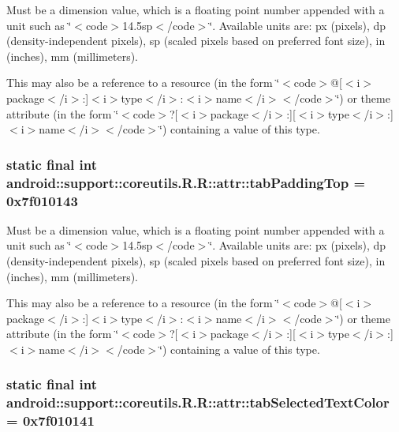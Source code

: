 Must be a dimension value, which is a floating point number appended with a unit such as \char`\"{}$<$code$>$14.5sp$<$/code$>$\char`\"{}. Available units are: px (pixels), dp (density-independent pixels), sp (scaled pixels based on preferred font size), in (inches), mm (millimeters). 

This may also be a reference to a resource (in the form \char`\"{}$<$code$>$@\mbox{[}$<$i$>$package$<$/i$>$:\mbox{]}$<$i$>$type$<$/i$>$:$<$i$>$name$<$/i$>$$<$/code$>$\char`\"{}) or theme attribute (in the form \char`\"{}$<$code$>$?\mbox{[}$<$i$>$package$<$/i$>$:\mbox{]}\mbox{[}$<$i$>$type$<$/i$>$:\mbox{]}$<$i$>$name$<$/i$>$$<$/code$>$\char`\"{}) containing a value of this type. \hypertarget{classandroid_1_1support_1_1coreutils_1_1_r_1_1attr_3a4fd4dd1fb23d69ed62369eb6d3840e}{
\subsubsection[{tabPaddingTop}]{\setlength{\rightskip}{0pt plus 5cm}static final int android::support::coreutils.R.R::attr::tabPaddingTop = 0x7f010143}}
\label{classandroid_1_1support_1_1coreutils_1_1_r_1_1attr_3a4fd4dd1fb23d69ed62369eb6d3840e}


Must be a dimension value, which is a floating point number appended with a unit such as \char`\"{}$<$code$>$14.5sp$<$/code$>$\char`\"{}. Available units are: px (pixels), dp (density-independent pixels), sp (scaled pixels based on preferred font size), in (inches), mm (millimeters). 

This may also be a reference to a resource (in the form \char`\"{}$<$code$>$@\mbox{[}$<$i$>$package$<$/i$>$:\mbox{]}$<$i$>$type$<$/i$>$:$<$i$>$name$<$/i$>$$<$/code$>$\char`\"{}) or theme attribute (in the form \char`\"{}$<$code$>$?\mbox{[}$<$i$>$package$<$/i$>$:\mbox{]}\mbox{[}$<$i$>$type$<$/i$>$:\mbox{]}$<$i$>$name$<$/i$>$$<$/code$>$\char`\"{}) containing a value of this type. \hypertarget{classandroid_1_1support_1_1coreutils_1_1_r_1_1attr_ce33febe524bb037e5200baf4550cdbf}{
\subsubsection[{tabSelectedTextColor}]{\setlength{\rightskip}{0pt plus 5cm}static final int android::support::coreutils.R.R::attr::tabSelectedTextColor = 0x7f010141}}
\label{classandroid_1_1support_1_1coreutils_1_1_r_1_1attr_ce33febe524bb037e5200baf4550cdbf}


